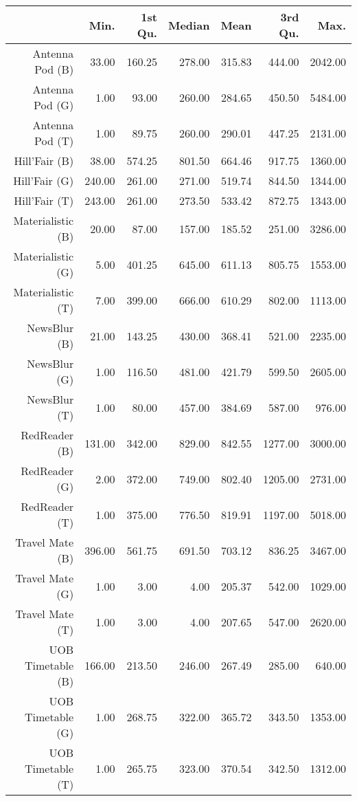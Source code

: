 \begin{table}[ht]
\centering
\begin{tabular}{rrrrrrr}
  \hline
 & Min. & 1st Qu. & Median & Mean & 3rd Qu. & Max. \\ 
  \hline
Antenna Pod (B) & 33.00 & 160.25 & 278.00 & 315.83 & 444.00 & 2042.00 \\ 
  Antenna Pod (G) & 1.00 & 93.00 & 260.00 & 284.65 & 450.50 & 5484.00 \\ 
  Antenna Pod (T) & 1.00 & 89.75 & 260.00 & 290.01 & 447.25 & 2131.00 \\ 
  Hill'Fair (B) & 38.00 & 574.25 & 801.50 & 664.46 & 917.75 & 1360.00 \\ 
  Hill'Fair (G) & 240.00 & 261.00 & 271.00 & 519.74 & 844.50 & 1344.00 \\ 
  Hill'Fair (T) & 243.00 & 261.00 & 273.50 & 533.42 & 872.75 & 1343.00 \\ 
  Materialistic (B) & 20.00 & 87.00 & 157.00 & 185.52 & 251.00 & 3286.00 \\ 
  Materialistic (G) & 5.00 & 401.25 & 645.00 & 611.13 & 805.75 & 1553.00 \\ 
  Materialistic (T) & 7.00 & 399.00 & 666.00 & 610.29 & 802.00 & 1113.00 \\ 
  NewsBlur (B) & 21.00 & 143.25 & 430.00 & 368.41 & 521.00 & 2235.00 \\ 
  NewsBlur (G) & 1.00 & 116.50 & 481.00 & 421.79 & 599.50 & 2605.00 \\ 
  NewsBlur (T) & 1.00 & 80.00 & 457.00 & 384.69 & 587.00 & 976.00 \\ 
  RedReader (B) & 131.00 & 342.00 & 829.00 & 842.55 & 1277.00 & 3000.00 \\ 
  RedReader (G) & 2.00 & 372.00 & 749.00 & 802.40 & 1205.00 & 2731.00 \\ 
  RedReader (T) & 1.00 & 375.00 & 776.50 & 819.91 & 1197.00 & 5018.00 \\ 
  Travel Mate (B) & 396.00 & 561.75 & 691.50 & 703.12 & 836.25 & 3467.00 \\ 
  Travel Mate (G) & 1.00 & 3.00 & 4.00 & 205.37 & 542.00 & 1029.00 \\ 
  Travel Mate (T) & 1.00 & 3.00 & 4.00 & 207.65 & 547.00 & 2620.00 \\ 
  UOB Timetable (B) & 166.00 & 213.50 & 246.00 & 267.49 & 285.00 & 640.00 \\ 
  UOB Timetable (G) & 1.00 & 268.75 & 322.00 & 365.72 & 343.50 & 1353.00 \\ 
  UOB Timetable (T) & 1.00 & 265.75 & 323.00 & 370.54 & 342.50 & 1312.00 \\ 
   \hline
\end{tabular}
\end{table}
